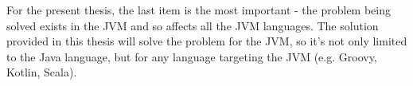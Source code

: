 \documentclass[..thesis.tex]{subfiles}
\begin{document}
For the present thesis, the last item is the most important - the problem being solved exists in the JVM and so affects all the JVM languages. 
The solution provided in this thesis will solve the problem for the JVM, so it's not only limited to the Java language, but for any language targeting the JVM (e.g. Groovy, Kotlin, Scala).
 


\end{document}
